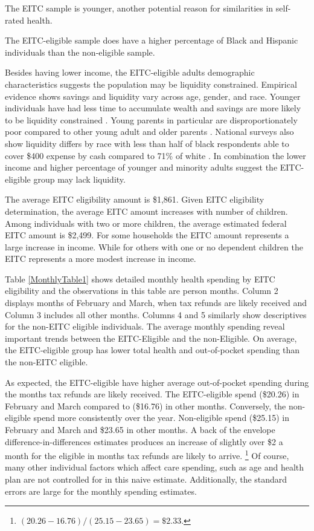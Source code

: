 \documentclass[smallcondensed,referee]{svjour3}
\begin{document}
The EITC sample is younger, another potential reason for similarities in self-rated health. 

The EITC-eligible sample does have a higher percentage of Black and Hispanic individuals than the non-eligible sample.

 Besides having lower income, the EITC-eligible adults demographic characteristics suggests the population may be liquidity constrained.  Empirical evidence shows savings and liquidity vary across age, gender, and race. Younger individuals have had less time to accumulate wealth and savings are more likely to be liquidity constrained \citep{jappelli_who_1990}. 
 Young parents in particular are disproportionately poor compared to other young adult and older parents \citep{carson_poverty_2020}. National surveys also show liquidity differs by race with less than half of black respondents able to cover \$400 expense by cash compared to 71\% of white \citep{federal_reserve_board_update_2020}. In combination the lower income and higher percentage of younger and minority adults suggest the EITC- eligible group may lack liquidity. 

 The average EITC eligibility amount is \$1,861. Given EITC eligibility determination, the average EITC amount increases with number of children. Among individuals with two or more children, the average estimated federal EITC amount is \$2,499. For some households the EITC amount represents a large increase in income. While for others with one or no dependent children the EITC represents a more modest increase in income.



Table \ref{MonthlyTable1} shows detailed monthly health spending by EITC eligibility and the  observations in this table are person months. Column 2 displays months of February and March, when tax refunds are likely received and Column 3 includes all other months. Columns 4 and 5 similarly show descriptives for the non-EITC eligible individuals.
The average monthly spending reveal important trends between the EITC-Eligible and the non-Eligible. On average, the EITC-eligible group has lower total health and out-of-pocket spending than the non-EITC eligible. 

As expected, the EITC-eligible have higher average out-of-pocket spending during the months tax refunds are likely received. 
The EITC-eligible spend (\$20.26) in February and March compared to (\$16.76) in other months. Conversely, the non-eligible spend more consistently over the year. Non-eligible spend (\$25.15) in February and March and \$23.65 in other months. A back of the envelope difference-in-differences estimates produces an increase of slightly over \$2 a month for the eligible in months tax refunds are likely to arrive.  \footnote{$(20.26- 16.76)/ (25.15- 23.65) = \$2.33.$} Of course, many other individual factors which affect care spending, such as age and health plan are not controlled for in this naive estimate. Additionally, the standard errors are large for the monthly spending estimates. 
\end{document}
